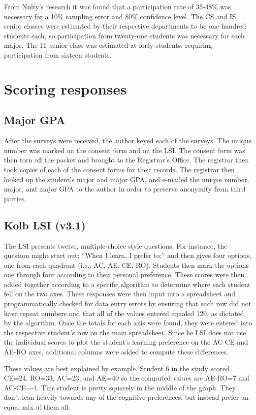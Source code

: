 From Nulty's research it was found that a participation rate of 35-48\% was necessary for a 10\% sampling error and 80\% confidence level. The CS and IS senior classes were estimated by their respective departments to be one hundred students each, so participation from twenty-one students was necessary for each major. The IT senior class was estimated at forty students, requiring participation from sixteen students.

\section{Scoring responses}
\subsection{Major GPA}
After the surveys were received, the author keyed each of the surveys. The unique number was marked on the consent form and on the LSI. The consent form was then torn off the packet and brought to the Registrar's Office. The registrar then took copies of each of the consent forms for their records. The registrar then looked up the student's major and major GPA, and e-mailed the unique number, major, and major GPA to the author in order to preserve anonymity from third parties.

\subsection{Kolb LSI (v3.1)}
The LSI presents twelve, multiple-choice style questions. For instance, the question might start out: ``When I learn, I prefer to:'' and then gives four options, one from each quadrant (i.e., AC, AE, CE, RO). Students then mark the options one through four according to their personal preference. These scores were then added together according to a specific algorithm to determine where each student fell on the two axes. These responses were then input into a spreadsheet and programmatically checked for data entry errors by ensuring that each row did not have repeat numbers and that all of the values entered equaled 120, as dictated by the algorithm. Once the totals for each axis were found, they were entered into the respective student's row on the main spreadsheet. Since he LSI does not use the individual scores to plot the student's learning preference on the AC-CE and AE-RO axes, additional columns were added to compute these differences.

These values are best explained by example. Student 6 in the study scored CE=24, RO=33, AC=23, and AE=40 so the computed values are AE-RO=7 and AC-CE=-1. This student is pretty squarely in the middle of the graph. They don't lean heavily towards any of the cognitive preferences, but instead prefer an equal mix of them all.

